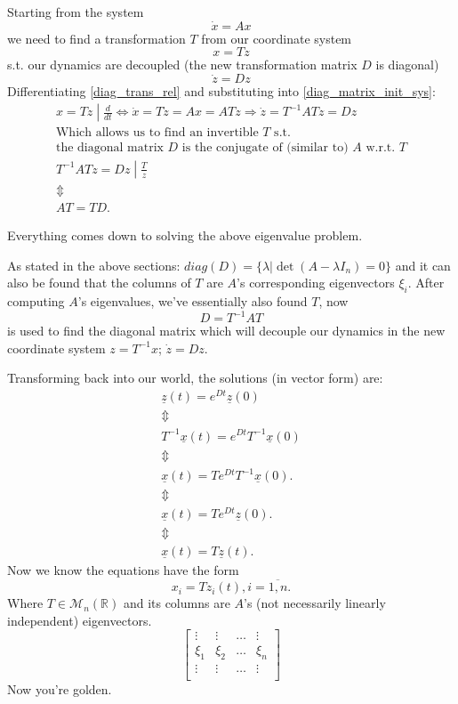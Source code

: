 Starting from the system
\begin{equation}\label{diag_matrix_init_sys}
	\dot{x} = A x
\end{equation}
we need to find a transformation $T$ from our coordinate system
\begin{equation}\label{diag_trans_rel}
	x = Tz
\end{equation}
s.t. our dynamics are decoupled (the new transformation matrix $D$ is diagonal)
\[
	\dot{z} = Dz
\]
Differentiating \ref{diag_trans_rel} and substituting into \ref{diag_matrix_init_sys}:
\begin{gather*}
	\left. x = Tz \middle| \frac{d}{dt} \right. \iff
	\dot{x} = T\dot{z} = Ax = ATz \Rightarrow \dot{z} = T^{-1} A T z = Dz \\
	\text{Which allows us to find an invertible } T \text{ s.t.} \\
	\text{the diagonal matrix } D \text{ is the conjugate of (similar to) } A \text{ w.r.t. } T \\
	\left. T^{-1} A T z = Dz \middle| \frac{T}{z}
	\right. \\
	\Updownarrow \\
	A T = T D.
\end{gather*}

Everything comes down to solving the above eigenvalue problem.

As stated in the above sections: $diag(D) = \{ \lambda | \det(A - \lambda I_n) = 0 \}$ and it can also be found that the columns of $T$ are $A$'s corresponding eigenvectors $\xi_i$.
After computing $A$'s eigenvalues, we've essentially also found $T$, now
\[
	D = T^{-1} A T
\]
is used to find the diagonal matrix which will decouple our dynamics in the new coordinate system $z = T^{-1} x$; $\dot{z} = D z$.

Transforming back into our world, the solutions (in vector form) are:
\begin{gather*}
	\underline{z}(t) = e^{Dt}\underline{z}(0) \\
	\Updownarrow \\
	T^{-1} \underline{x}(t) = e^{Dt} T^{-1} \underline{x}(0) \\
	\Updownarrow \\
	\underline{x}(t) = T e^{Dt} T^{-1} \underline{x}(0). \\
	\Updownarrow \\
	\underline{x}(t) = T e^{Dt} \underline{z}(0). \\
	\Updownarrow \\
	\underline{x}(t) = T \underline{z}(t).
\end{gather*}
Now we know the equations have the form
\[
	x_i = T z_i(t), i = \overline{1,n}.
\]
Where $T \in \mathcal{M}_n(\mathbb{R})$ and its columns are $A$'s (not necessarily linearly independent) eigenvectors.
\begin{equation*}
	\begin{bmatrix*}
		\vdots & \vdots & \dots & \vdots \\
		\xi_1 & \xi_2 & \dots & \xi_n \\
		\vdots & \vdots & \dots & \vdots \\
	\end{bmatrix*}
\end{equation*}
Now you're golden.


